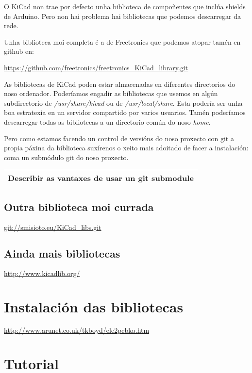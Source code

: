 O KiCad non trae por defecto unha biblioteca de compoñentes que inclúa
shields de Arduino. Pero non hai problema hai bibliotecas que podemos
descarregar da rede.

Unha biblioteca moi completa é a de Freetronics que podemos atopar tamén
en github en:

\url{https://github.com/freetronics/freetronics_KiCad_library.git}

As bibliotecas de KiCad poden estar almacenadas en diferentes
directorios do noso ordenador. Poderíamos engadir as bibliotecas que
usemos en algún subdirectorio de \emph{/usr/share/kicad} ou de
\emph{/usr/local/share}. Esta podería ser unha boa estratexia en un
servidor compartido por varios usuarios. Tamén poderíamos descarregar
todas as bibliotecas a un directorio común do noso \emph{home}.

Pero como estamos facendo un control de versións do noso proxecto con
git a propia páxina da biblioteca suxírenos o xeito mais adoitado de
facer a instalación: coma un submódulo git do noso proxecto.

\begin{longtable}[c]{@{}l@{}}
\toprule
Describir as vantaxes de usar un git submodule\tabularnewline
\bottomrule
\end{longtable}

\subsection{Outra biblioteca moi
currada}\label{outra-biblioteca-moi-currada}

\url{git://smisioto.eu/KiCad_libs.git}

\subsection{Ainda mais bibliotecas}\label{ainda-mais-bibliotecas}

\url{http://www.kicadlib.org/}

\section{Instalación das
bibliotecas}\label{instalaciuxf3n-das-bibliotecas}

\url{http://www.arunet.co.uk/tkboyd/ele2pcbka.htm}

\section{Tutorial}\label{tutorial}

